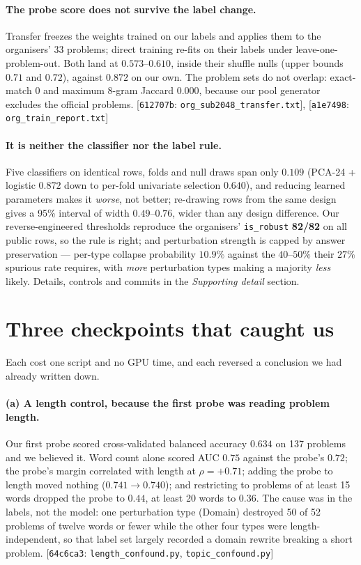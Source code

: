 \documentclass[10pt]{article}
\newcommand{\cmt}[2]{{\footnotesize\textsf{[}\texttt{#1}\textsf{:} #2\textsf{]}}}
\begin{document}
\paragraph{The probe score does not survive the label change.} Transfer freezes the weights trained
on our labels and applies them to the organisers' 33 problems; direct training re-fits on their
labels under leave-one-problem-out. Both land at $0.573$--$0.610$, inside their shuffle nulls (upper
bounds $0.71$ and $0.72$), against $0.872$ on our own. The problem sets do not overlap: exact-match 0
and maximum 8-gram Jaccard $0.000$, because our pool generator excludes the official problems.
\cmt{612707b}{\texttt{org\_sub2048\_transfer.txt}}, \cmt{a1e7498}{\texttt{org\_train\_report.txt}}

\paragraph{It is neither the classifier nor the label rule.} Five classifiers on identical rows,
folds and null draws span only $0.109$ (PCA-24 + logistic $0.872$ down to per-fold univariate
selection $0.640$), and reducing learned parameters makes it \emph{worse}, not better; re-drawing
rows from the same design gives a 95\% interval of width $0.49$--$0.76$, wider than any design
difference. Our reverse-engineered thresholds reproduce the organisers' \texttt{is\_robust}
\textbf{82/82} on all public rows, so the rule is right; and perturbation strength is capped by
answer preservation --- per-type collapse probability $10.9\%$ against the $40$--$50\%$ their
$27\%$ spurious rate requires, with \emph{more} perturbation types making a majority \emph{less}
likely. Details, controls and commits in the \emph{Supporting detail} section.

\section{Three checkpoints that caught us}
\label{sec:checkpoints}
Each cost one script and no GPU time, and each reversed a conclusion we had already written down.

\paragraph{(a) A length control, because the first probe was reading problem length.} Our first
probe scored cross-validated balanced accuracy $0.634$ on 137 problems and we believed it. Word
count alone scored AUC $0.75$ against the probe's $0.72$; the probe's margin correlated with length
at $\rho = +0.71$; adding the probe to length moved nothing ($0.741 \to 0.740$); and restricting to
problems of at least 15 words dropped the probe to $0.44$, at least 20 words to $0.36$. The cause
was in the labels, not the model: one perturbation type (Domain) destroyed 50 of 52 problems of
twelve words or fewer while the other four types were length-independent, so that label set largely
recorded a domain rewrite breaking a short problem.
\cmt{64c6ca3}{\texttt{length\_confound.py}, \texttt{topic\_confound.py}}
\end{document}
